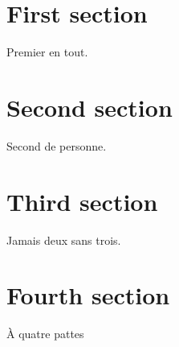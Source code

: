 \documentclass{article}
\begin{document}
\section{First section}
Premier en tout.
\section{Second section}
Second de personne.
\section{Third section}
Jamais deux sans trois.
\section{Fourth section}
\`A quatre pattes
\end{document}
